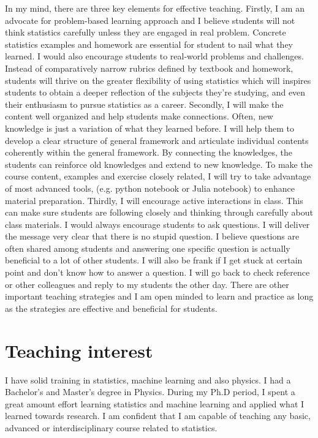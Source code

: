 \documentclass[12pt]{amsart} \usepackage{amssymb}
\begin{document}
In my mind, there are three key elements for effective teaching.
Firstly, I am an advocate for problem-based learning approach and 
I believe students will not think statistics carefully unless they are engaged in real problem.
Concrete statistics examples and homework are essential for student to nail what they learned.
I would also encourage students to real-world problems and challenges.
Instead of comparatively narrow rubrics defined by textbook and homework, 
students will thrive on the greater flexibility of using statistics
which will inspires students to obtain a deeper reflection of the subjects they're studying,
and even their enthusiasm to pursue statistics as a career. 
Secondly, I will make the content well organized and help students make connections.
Often, new knowledge is just a variation of what they learned before.
I will help them to develop a clear structure of general framework and 
articulate  individual contents coherently within the general framework.
By connecting the knowledges,
the students can reinforce old knowledges and extend to new knowledge.
To make the course content, examples and exercise closely related,
I will try to take advantage of most advanced tools, (e.g. python notebook or Julia notebook) to enhance material preparation.
Thirdly, I will encourage active interactions in class.
This can make sure students are following closely and thinking through carefully about class materials.
I would always encourage students to ask questions.
I will deliver the message very clear that there is no stupid question. 
I believe questions are often shared among students and
answering one specific question is actually beneficial to a lot of other students.
I will also be frank if I get stuck at certain point and don't know how to answer a question.
I will go back to check reference or other colleagues and reply to my students the other day.
There are other important teaching strategies and I am open minded to learn and practice as long as the strategies are effective and beneficial for students.


\section{Teaching interest}
I have solid training in statistics, machine learning and also physics.
I had a Bachelor's and Master's degree in Physics.
During my Ph.D period,
I spent a great amount effort learning statistics and machine learning and applied what I learned towards research.
I am confident that I am capable of teaching any basic, advanced or interdisciplinary course related to statistics.
\end{document}
